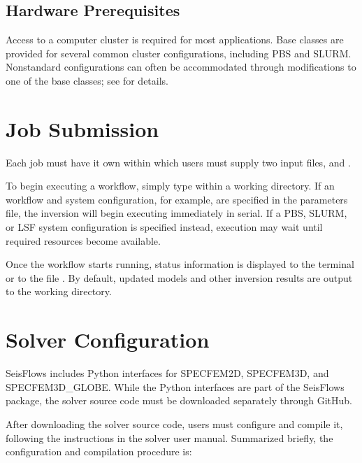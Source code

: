\documentclass[letterpaper,10pt,english]{sphinxmanual}
\begin{document}
\subsection{Hardware Prerequisites}
\label{\detokenize{main/usage:hardware-prerequisites}}
Access to a computer cluster is required for most applications.  Base classes are provided for several common cluster configurations, including PBS and SLURM.  Nonstandard configurations can often be accommodated through modifications to one of the base classes; see {\hyperref[\detokenize{main/usage:system}]{}} for details.


\section{Job Submission}
\label{\detokenize{main/usage:job-submission}}\label{\detokenize{main/usage:submission}}
Each job must have it own  within which users must supply two input files,  and .

To begin executing a workflow, simply type  within a working directory. If an  workflow and  system configuration, for example, are specified in the parameters file, the inversion will begin executing immediately in serial. If a PBS, SLURM, or LSF system configuration is specified instead, execution may wait until required resources become available.

Once the workflow starts running, status information is displayed to the terminal or to the file .  By default, updated models and other inversion results are output to the working directory.


\section{Solver Configuration}
\label{\detokenize{main/usage:solver-configuration}}\label{\detokenize{main/usage:solver}}
SeisFlows includes Python interfaces for SPECFEM2D, SPECFEM3D, and SPECFEM3D\_GLOBE.  While the Python interfaces are part of the SeisFlows package, the solver source code must be downloaded separately through GitHub.

After downloading the solver source code, users must configure and compile it, following the instructions in the solver user manual. Summarized briefly, the configuration and compilation procedure is:
\end{document}
